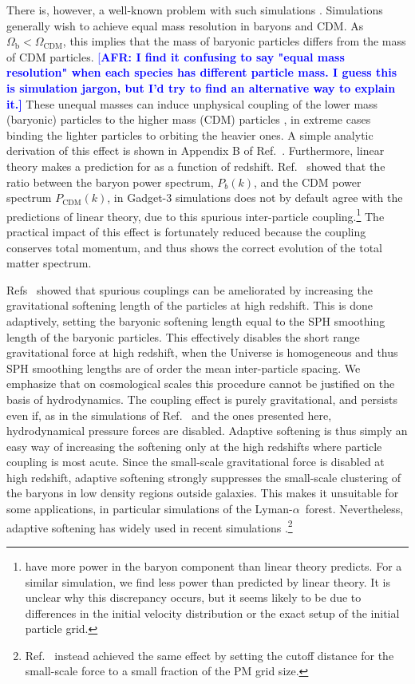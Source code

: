 \documentclass[a4paper,11pt]{article}
\newcommand{\Lya}{Lyman-$\alpha$}
\newcommand{\AFR}[1]{\textcolor{blue}{[\bf AFR: #1]} }
\begin{document}
There is, however, a well-known problem with such simulations \cite{OLeary:2012, Angulo:2013}. Simulations generally wish to achieve equal mass resolution in baryons and CDM. As $\Omega_\mathrm{b} < \Omega_\mathrm{CDM}$, this implies that the mass of baryonic particles differs from the mass of CDM particles.
\AFR{I find it confusing to say "equal mass resolution" when each species has different particle mass. 
I guess this is simulation jargon, but I'd try to find an alternative way to explain it.}
 These unequal masses can induce unphysical coupling of the lower mass (baryonic) particles to the higher mass (CDM) particles \cite{OLeary:2012}, in extreme cases binding the lighter particles to orbiting the heavier ones. A simple analytic derivation of this effect is shown in Appendix B of Ref.~\cite{OLeary:2012}. Furthermore, linear theory makes a prediction for  as a function of redshift. Ref.~\cite{Angulo:2013} showed that the ratio between the baryon power spectrum, $P_b(k)$, and the CDM power spectrum $P_\mathrm{CDM}(k)$, in Gadget-3 \cite{Springel:2005} simulations does not by default agree with the predictions of linear theory, due to this spurious inter-particle coupling.\footnote{\cite{Angulo:2013} have more power in the baryon component than linear theory predicts. For a similar simulation, we find less power than predicted by linear theory. It is unclear why this discrepancy occurs, but it seems likely to be due to differences in the initial velocity distribution or the exact setup of the initial particle grid.} The practical impact of this effect is fortunately reduced because the coupling conserves total momentum, and thus shows the correct evolution of the total matter spectrum.

Refs~\cite{OLeary:2012, Angulo:2013} showed that spurious couplings can be ameliorated by increasing the gravitational softening length of the particles at high redshift. This is done adaptively, setting the baryonic softening length equal to the SPH smoothing length of the baryonic particles. This effectively disables the short range gravitational force at high redshift, when the Universe is homogeneous and thus SPH smoothing lengths are of order the mean inter-particle spacing. We emphasize that on cosmological scales this procedure cannot be justified on the basis of hydrodynamics. The coupling effect is purely gravitational, and persists even if, as in the simulations of Ref.~\cite{Angulo:2013} and the ones presented here, hydrodynamical pressure forces are disabled. Adaptive softening is thus simply an easy way of increasing the softening only at the high redshifts where particle coupling is most acute. Since the small-scale gravitational force is disabled at high redshift, adaptive softening strongly suppresses the small-scale clustering of the baryons in low density regions outside galaxies. This makes it unsuitable for some applications, in particular simulations of the \Lya~forest. Nevertheless, adaptive softening has widely used in recent simulations \cite[e.g][]{Paco:2018}.\footnote{Ref.~\cite{Valkenburg:2017} instead achieved the same effect by setting the cutoff distance for the small-scale force to a small fraction of the PM grid size.}
\end{document}
